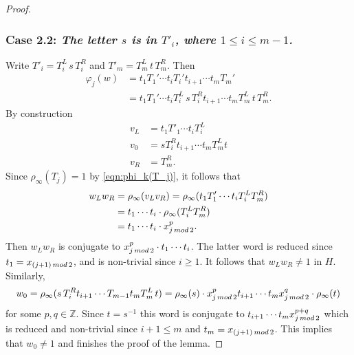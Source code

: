 \documentclass[10pt,a4paper]{amsart}
\begin{document}
\begin{proof}
\subsubsection*{Case 2.2: {\it The letter $s$ is in $T'_i$, where $1\leq i\leq m-1$.}}
Write $T'_i=T^L_i\, s\, T^R_i$ and $T'_m=T^L_m\, t\, T^R_m$.
Then
\begin{align*}
\varphi_{j}(w) 
&= 
t_1T_1'\cdots t_i T_i't_{i+1} %
\cdots t_m  T_m'  %
\\
&= 
t_1T_1'\cdots t_iT^L_i\, s\, T^R_i t_{i+1} \cdots t_m T^L_m\, t\, T^R_m.
\end{align*}
By construction 
\begin{align*}
v_L &= t_1T'_1\cdots t_iT^L_i\\
v_0 &= sT^R_it_{i+1}\cdots t_m T^L_mt\\
v_R &= T^R_m.
\end{align*}
Since $\rho_\infty(T_j)=1$ by \eqref{eqn:phi_k(T_j)}, it follows that
\begin{align*}
w_Lw_R &= \rho_{\infty}(v_Lv_R) =\rho_{\infty}(t_1T'_1\cdots t_i T^L_iT^R_m)\\
&=t_1\cdots t_i  \cdot \rho_{\infty}(T^L_iT^R_m) \\
&=t_1\cdots t_i \cdot x_{j\,{\rm mod}\,2}^p.
\end{align*}
Then $w_Lw_R$ is conjugate to $x_{j\,{\rm mod}\,2}^p \cdot t_1\cdots t_i$.
The latter word is reduced since $t_1=x_{(j+1)\,{\rm mod}\,2}$, and is  non-trivial since $i \geq 1$.
It follows that $w_Lw_R\neq 1$ in $H$. 
Similarly,
$$
w_0 = 
\rho_{\infty}(s\, T^R_it_{i+1}\cdots T_{m-1}t_mT^L_m\, t) 
= \rho_\infty(s) \cdot x_{j\,{\rm mod}\,2}^pt_{i+1}\cdots t_m x_{j\,{\rm mod}\,2}^q \cdot \rho_\infty(t)
$$
for some $p,q\in \mathbb Z$. 
Since $t=s^{-1}$ this word is conjugate to
$t_{i+1}\cdots t_m x_{j\,{\rm mod}\,2}^{p+q}$ which is reduced and non-trivial
since $i+1 \leq m$ and $t_m = x_{(j+1)\,{\rm mod}\,2}$. This implies that $w_0\neq 1$ and finishes
the proof of the lemma.
\end{proof}
\end{document}
